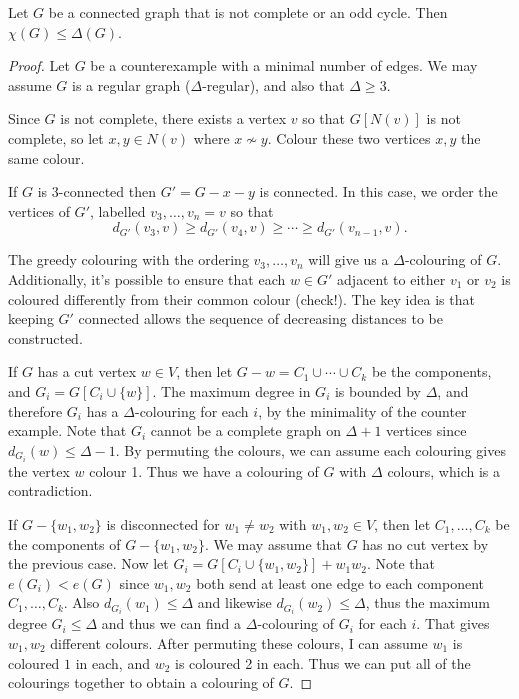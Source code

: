 \begin{theorem}
	Let $G$ be a connected graph that is not complete or an odd cycle. Then $\chi(G) \leq \Delta(G)$.
\end{theorem}
\begin{proof}
	Let $G$ be a counterexample with a minimal number of edges.
	We may assume $G$ is a regular graph ($\Delta$-regular), and also that $\Delta \geq 3$.

	Since $G$ is not complete, there exists a vertex $v$ so that $G[N(v)]$ is not complete, so let $x, y \in N(v)$ where $x \not \sim y$. Colour these two vertices $x,y$ the same colour. 

	If $G$ is 3-connected then $G' = G - x - y$ is connected. In this case, we order the vertices of $G'$, labelled $v_3, \dots , v_n = v$ so that
	$$
		d_{G'}(v_3, v) \geq d_{G'}(v_4, v) \geq \cdots \geq d_{G'}(v_{n - 1}, v).
	$$
	
	The greedy colouring with the ordering $v_3, \dots, v_n$ will give us a $\Delta$-colouring of $G$. Additionally, it's possible to ensure that each $w \in G'$ adjacent to either $v_1$ or $v_2$ is coloured differently from their common colour (check!). The key idea is that keeping $G'$ connected allows the sequence of decreasing distances to be constructed. 

	If $G$ has a cut vertex $w \in V$, then let $G- w = C_1 \cup \cdots \cup C_k$ be the components, and $G_i = G[C_i \cup \{w\}]$. The maximum degree in $G_i$ is bounded by $\Delta$, and therefore $G_i$ has a $\Delta$-colouring for each $i$, by the minimality of the counter example. 
	Note that $G_i$ cannot be a complete graph on $\Delta + 1$ vertices since $d_{G_i}(w) \leq \Delta - 1$.
	By permuting the colours, we can assume each colouring gives the vertex $w$ colour 1. Thus we have a colouring of $G$ with $\Delta$ colours, which is a contradiction.

	If $G-\{w_1, w_2\}$ is disconnected for $w_1 \neq w_2$ with $w_1, w_2 \in V$, then let $C_1, \dots, C_k$ be the components of $G - \{w_1, w_2\}$. We may assume that $G$ has no cut vertex by the previous case. Now let $G_i = G[C_i \cup \{w_1, w_2\}]+ w_1w_2$. Note that $e(G_i) < e(G)$ since $w_1, w_2$ both send at least one edge to each component $C_1, \dots, C_k$. Also $d_{G_i}(w_1) \leq \Delta$ and likewise $d_{G_i}(w_2) \leq \Delta$, thus the maximum degree $G_i \leq \Delta$ and thus we can find a $\Delta$-colouring of $G_i$ for each $i$. That gives $w_1, w_2$ different colours. After permuting these colours, I can assume $w_1$ is coloured $1$ in each, and $w_2$ is coloured 2 in each. Thus we can put all of the colourings together to obtain a colouring of $G$.
\end{proof}

